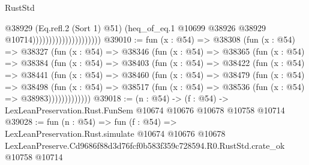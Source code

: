 \begin{lexlean}{RustStd}
\begin{coremodule}
                                            @38929
                                            (Eq.refl.{2} (Sort 1) @51)
                                            (heq_of_eq.{1}
                                              @10699
                                              @38926
                                              @38929
                                              @10714)))))))))))))))))))))
@39010 := fun (x : @54) =>
  @38308
    (fun (x : @54) =>
    @38327
      (fun (x : @54) =>
      @38346
        (fun (x : @54) =>
        @38365
          (fun (x : @54) =>
          @38384
            (fun (x : @54) =>
            @38403
              (fun (x : @54) =>
              @38422
                (fun (x : @54) =>
                @38441
                  (fun (x : @54) =>
                  @38460
                    (fun (x : @54) =>
                    @38479
                      (fun (x : @54) =>
                      @38498
                        (fun (x : @54) =>
                        @38517 (fun (x : @54) => @38536 (fun (x : @54) => @38983)))))))))))))
@39018 := (n : @54) ->
  (f : @54) -> LexLeanPreservation.Rust.FunSem @10674 @10676 @10678 @10758 @10714
@39028 := fun (n : @54) =>
  fun (f : @54) =>
  LexLeanPreservation.Rust.simulate
    @10674
    @10676
    @10678
    LexLeanPreserve.Cd9686f88d3d76fcf0b583f359c728594.R0.RustStd.crate_ok
    @10758
    @10714
\end{coremodule}
\end{lexlean}
